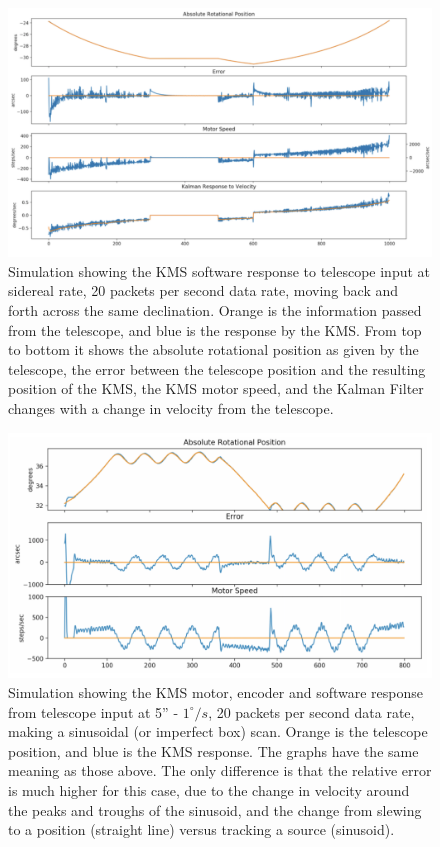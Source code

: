 \documentclass[manuscript]{aastex}
\begin{document}
\begin{figure}[H]
	\centering
	\captionsetup{width=\textwidth}
	\includegraphics[width=\textwidth]{km7.png}%
	\caption[Simulated KMS Performance, Simple Rastering Scan]{Simulation showing the KMS software response to telescope input at sidereal rate, 20 packets per second data rate, moving back and forth across the same declination. Orange is the information passed from the telescope, and blue is the response by the KMS. From top to bottom it shows the absolute rotational position as given by the telescope, the error between the telescope position and the resulting position of the KMS, the KMS motor speed, and the Kalman Filter changes with a change in velocity from the telescope.}%
	\label{fig:km7}%
\end{figure}

\newpage
\begin{figure}[H]
	\centering
	\captionsetup{width=\textwidth}
	\includegraphics[width=\textwidth]{km8.png}%
	\caption[Simulated KMS Performance, Realistic Box Scan]{Simulation showing the KMS motor, encoder and software response from telescope input at 5'' - $1^{\circ}/s$, 20 packets per second data rate, making a sinusoidal (or imperfect box) scan. Orange is the telescope position, and blue is the KMS response. The graphs have the same meaning as those above. The only difference is that the relative error is much higher for this case, due to the change in velocity around the peaks and troughs of the sinusoid, and the change from slewing to a position (straight line) versus tracking a source (sinusoid).}%
	\label{fig:km8}%
\end{figure}
\end{document}
